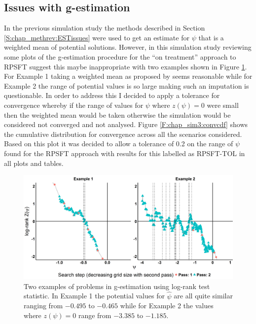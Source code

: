 \subsection{Issues with g-estimation}
\label{S:chap_sim3:gest}
In the previous simulation study the methods described in Section \ref{S:chap_methrev:ESTissues} were used to get an estimate for $\psi$ that is a weighted mean of potential solutions. However, in this simulation study reviewing some plots of the g-estimation procedure for the ``on treatment'' approach to RPSFT suggest this maybe inappropriate with two examples shown in Figure \ref{F:chap_sim3:badgest}. For Example 1 taking a weighted mean as proposed by \cite{White1999} seems reasonable while for Example 2 the range of potential values is so large making such an imputation is questionable. In order to address this I decided to apply a tolerance for convergence whereby if the range of values for $\psi$ where $z(\psi)=0$ were small then the weighted mean would be taken otherwise the simulation would be considered not converged and not analysed. Figure \ref{F:chap_sim3:convcdf} shows the cumulative distribution for convergence across all the scenarios considered. Based on this plot it was decided to allow a tolerance of 0.2 on the range of $\psi$ found for the RPSFT approach with results for this labelled as RPSFT-TOL in all plots and tables.
\begin{figure}[ht]
\centering
\includegraphics[width=13cm]{images/chap_sim3/badsearch.png}
\caption{\label{F:chap_sim3:badgest} Two examples of problems in g-estimation using log-rank test statistic. In Example 1 the potential values for $\hat{\psi}$ are all quite similar ranging from  $-0.495$ to $-0.465$ while for Example 2 the values where $z(\psi)=0$ range from $-3.385$ to $-1.185$. } 
\end{figure}

